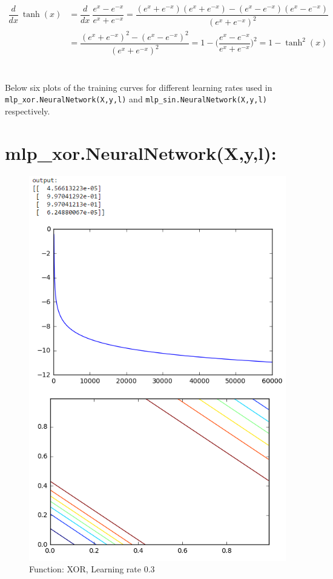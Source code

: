 \documentclass[11pt]{article}
\newcommand{\exercise}{\section{}}
\begin{document}
\begin{align*}
	\dfrac{d}{dx}\ \tanh(x) &= \dfrac{d}{dx}\ \dfrac{e^x - e^{-x}}{e^x + e^{-x}} 
	= \dfrac{(e^x + e^{-x})(e^x + e^{-x}) - (e^x - e^{-x})(e^x - e^{-x})}{(e^x + e^{-x})^2}\\
	&= \dfrac{(e^x + e^{-x})^2 - (e^x - e^{-x})^2}{(e^x + e^{-x})^2} = 1 - \Big(\dfrac{e^x - e^{-x}}{e^x + e^{-x}}\Big)^2 = 1 - \tanh^2(x)
\end{align*}

\exercise
Below six plots of the training curves for different learning rates used in \texttt{mlp\_xor.NeuralNetwork(X,y,l)} and \texttt{mlp\_sin.NeuralNetwork(X,y,l)} respectively.
\section*{mlp\_xor.NeuralNetwork(X,y,l):}
\begin{figure}[H]
	\centering
	\includegraphics[width=0.7\linewidth]{xor_lr03}
	\caption{Function: XOR, Learning rate 0.3}
	\label{fig:xorlr03}
\end{figure}
\end{document}

